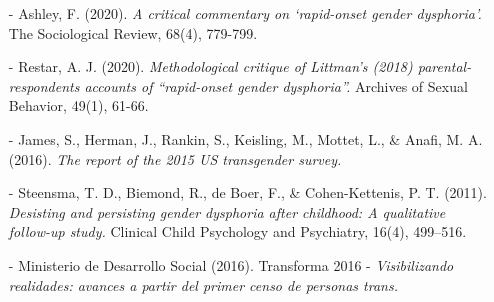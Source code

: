 \documentclass{article}
\begin{document}
\begin{enumerate}
\item[-]Ashley, F. (2020). \textit{A critical commentary on ‘rapid-onset gender dysphoria’.} The Sociological Review, 68(4), 779-799.

\item[-]Restar, A. J. (2020). \textit{Methodological critique of Littman’s (2018) parental-respondents accounts of “rapid-onset gender dysphoria”.} Archives of Sexual Behavior, 49(1), 61-66.

\item[-]James, S., Herman, J., Rankin, S., Keisling, M., Mottet, L., \& Anafi, M. A. (2016). \textit{The report of the 2015 US transgender survey.}

\item[-]Steensma, T. D., Biemond, R., de Boer, F., \& Cohen-Kettenis, P. T. (2011). \textit{Desisting and persisting gender dysphoria after childhood: A qualitative follow-up study.} Clinical Child Psychology and Psychiatry, 16(4), 499–516.

\item[-]Ministerio de Desarrollo Social (2016). Transforma 2016 - \textit{Visibilizando realidades: avances a partir del primer censo de personas trans.}

\end{enumerate}
\end{document}
